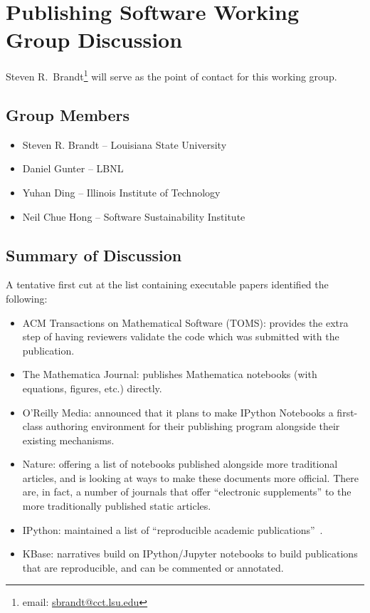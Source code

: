 \section{Publishing Software Working Group Discussion}
\label{sec:appendix_publishing_SW}

Steven R.\ Brandt\footnote{email:
\href{mailto:sbrandt@cct.lsu.edu}{sbrandt@cct.lsu.edu}} will serve as the point
of contact for this working group.

\subsection{Group Members}

\begin{itemize}
\item Steven R. Brandt -- Louisiana State University
\item Daniel Gunter -- LBNL
\item Yuhan Ding -- Illinois Institute of Technology
\item Neil Chue Hong -- Software Sustainability Institute
\end{itemize}

\subsection{Summary of Discussion}

A tentative first cut at the list containing executable papers identified the following:
\begin{itemize}

\item ACM Transactions on Mathematical Software (TOMS): provides the extra step
of having reviewers validate the code which was submitted with the publication.
 
\item The Mathematica Journal: publishes Mathematica notebooks (with equations,
figures, etc.) directly.

\item O'Reilly Media: announced that it plans to make IPython Notebooks a
first-class authoring environment for their publishing program alongside their
existing mechanisms.

\item Nature: offering a list of notebooks published alongside more traditional
articles, and is looking at ways to make these documents more official. There
are, in fact, a number of journals that offer ``electronic supplements'' to the
more traditionally published static articles.

\item IPython: maintained a list of ``reproducible academic
publications''~\cite{ipython-pubs}.

\item KBase: narratives build on IPython\slash Jupyter notebooks to build
publications that are reproducible, and can be commented or annotated.
  
\end{itemize}

